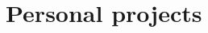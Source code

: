 \documentclass[11pt,a4paper]{article}
\begin{document}

\midrule

\section*{Personal projects}




\end{document}
